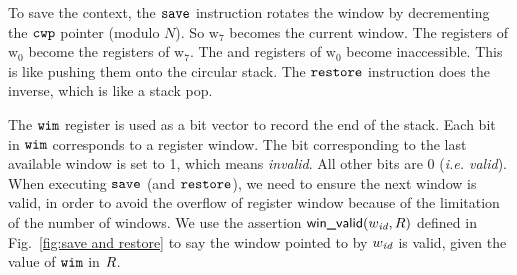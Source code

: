 To save the context, the $\texttt{save}$ instruction
rotates the window by decrementing the $\texttt{cwp}$ pointer
(modulo $N$).
So $\text{w}_7$ becomes the current window. The \outRN{}
registers of $\text{w}_0$ become
the \inRN{} registers of $\text{w}_7$.
The \inRN{} and \localRN{} registers of $\text{w}_0$
become inaccessible.
This is like pushing them
onto the circular stack.
The $\texttt{restore}$ instruction does the inverse, which is like
a stack pop.

The $\texttt{wim}$ register is used as a bit vector to record the
end of the stack. Each bit in $\texttt{wim}$ corresponds to a
register window. The bit corresponding to the last available
window is set to 1, which means {\em invalid}. All other bits
are 0 ({\em i.e. valid}).
When executing $\texttt{save}$ (and $\texttt{restore}$), we need to ensure
the next window is valid, in order to avoid the overflow
of register window because of the limitation of the number
of windows. We use the assertion $\textsf{win\_valid}{(}w_{\textit{id}}, R)$ defined
in Fig.~\ref{fig:save and restore} to say the
window pointed to by $w_{\textit{id}}$ is valid, given the value of
$\texttt{wim}$ in $R$.

